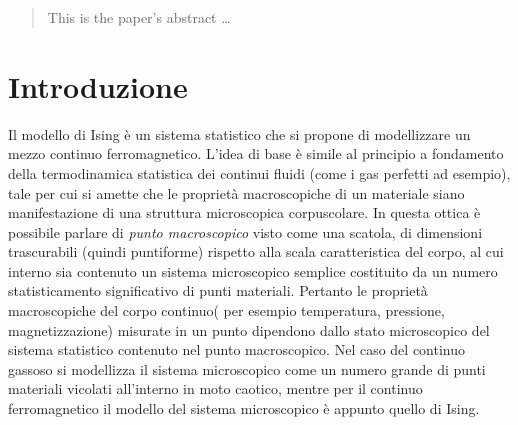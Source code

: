 \documentclass[11pt]{article}
\theoremstyle{plain}
\begin{document}
\maketitle

\begin{abstract}
This is the paper's abstract \ldots
\end{abstract}


\section{Introduzione}\label{Introduzione}
Il modello di Ising è un sistema statistico che si propone di modellizzare un mezzo continuo ferromagnetico.
L'idea di base è simile al principio a fondamento della termodinamica statistica dei continui fluidi (come i gas perfetti ad esempio), tale per cui si amette che le proprietà macroscopiche di un materiale siano manifestazione di una struttura microscopica corpuscolare.
In questa ottica è possibile parlare di \emph{punto macroscopico} visto come una scatola, di dimensioni trascurabili (quindi puntiforme) rispetto alla scala caratteristica del corpo, al cui interno sia contenuto un sistema microscopico semplice costituito da un numero statisticamento significativo di punti materiali.
Pertanto le proprietà macroscopiche del corpo continuo( per esempio temperatura, pressione, magnetizzazione) misurate in un punto dipendono dallo stato microscopico del sistema statistico contenuto nel punto macroscopico.
Nel caso del continuo gassoso si modellizza il sistema microscopico come un numero grande di punti materiali vicolati all'interno in moto caotico, mentre per il continuo ferromagnetico il modello del sistema microscopico è appunto quello di Ising.
\end{document}

